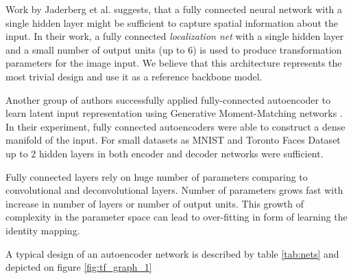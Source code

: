 Work by Jaderberg et al. \cite{Jaderberg2015} suggests, that a fully connected neural network with a single hidden layer might be sufficient to capture spatial information about the input.
In their work, a fully connected \textit{localization net} with a single hidden layer and a small number of output units (up to 6) is used to produce transformation parameters for the image input.
We believe that this architecture represents the most trivial design and use it as a reference backbone model.

Another group of authors successfully applied fully-connected autoencoder to learn latent input representation using Generative Moment-Matching networks \cite{Li2015}.
In their experiment, fully connected autoencoders were able to construct a dense manifold of the input.
For small datasets as MNIST and Toronto Faces Dataset \cite{tfd,lecun-mnisthandwrittendigit-2010} up to 2 hidden layers in both encoder and decoder networks were sufficient.

Fully connected layers rely on huge number of parameters comparing to convolutional and deconvolutional layers.
Number of parameters grows fast with increase in number of layers or number of output units.
This growth of complexity in the parameter space can lead to over-fitting in form of learning the identity mapping.

A typical design of an autoencoder network is described by table \ref{tab:nets} and depicted on figure \ref{fig:tf_graph_1}


